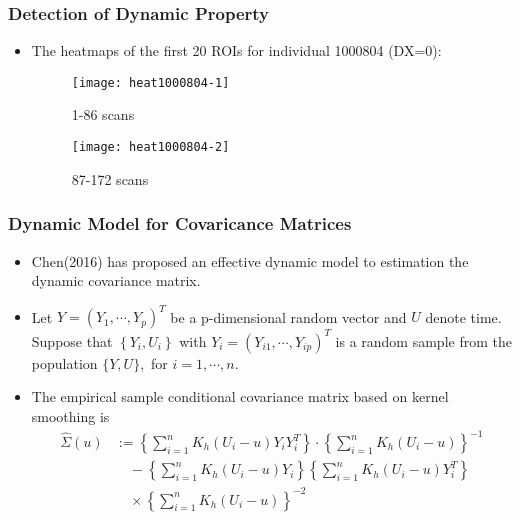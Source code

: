 \documentclass{beamer}
\begin{document}
\begin{frame}
\frametitle{Detection of Dynamic Property}
\begin{itemize}
	\item The heatmaps of the first 20 ROIs for individual 1000804 (DX=0):
	\begin{figure}
		\begin{minipage}[t]{0.45\linewidth}
			\centering
			\texttt{[image: heat1000804-1]}
			\caption{1-86 scans}
		\end{minipage}
		\begin{minipage}[t]{0.45\linewidth}
			\centering
			\texttt{[image: heat1000804-2]}
			\caption{87-172 scans}
		\end{minipage}
	\end{figure}
	
\end{itemize}

\end{frame}

\begin{frame}
\frametitle{Dynamic Model for Covaricance Matrices}
\begin{itemize}
\item Chen(2016) has proposed an effective dynamic model to estimation the dynamic covariance matrix. 
\item Let $Y=\left(Y_{1}, \cdots, Y_{p}\right)^{T}$ be a p-dimensional random vector and $U$ denote time. Suppose that $\left\{Y_{i}, U_{i}\right\}$ with $Y_{i}=\left(Y_{i 1}, \cdots, Y_{i p}\right)^{T}$ is a random sample from the population $\{Y, U\},$ for $i=1, \cdots, n$.
\item The empirical sample conditional covariance matrix based on kernel smoothing is 
$$
\begin{aligned} \hat{\Sigma}(u) & :=  \left\{\sum_{i=1}^{n} K_{h}\left(U_{i}-u\right) Y_{i} Y_{i}^{T}\right\} \cdot \left\{\sum_{i=1}^{n} K_{h}\left(U_{i}-u\right)\right\}^{-1} \\ 
&\quad -\left\{\sum_{i=1}^{n} K_{h}\left(U_{i}-u\right) Y_{i}\right\}\left\{\sum_{i=1}^{n} K_{h}\left(U_{i}-u\right) Y_{i}^{T}\right\}\\
&\quad \times \left\{\sum_{i=1}^{n} K_{h}\left(U_{i}-u\right)\right\}^{-2} \end{aligned}
$$

\end{itemize}

\end{frame}
\end{document}
